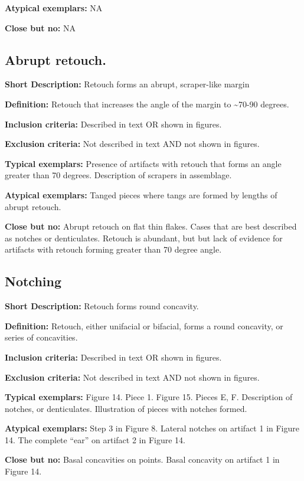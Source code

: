 \documentclass[
]{article}
\begin{document}
\textbf{Atypical exemplars:} NA

\textbf{Close but no:} NA

\subsection{Abrupt retouch.}\label{abrupt-retouch.}

\textbf{Short Description:} Retouch forms an abrupt, scraper-like margin

\textbf{Definition:} Retouch that increases the angle of the margin to
\textasciitilde70-90 degrees.

\textbf{Inclusion criteria:} Described in text OR shown in figures.

\textbf{Exclusion criteria:} Not described in text AND not shown in
figures.

\textbf{Typical exemplars:} Presence of artifacts with retouch that
forms an angle greater than 70 degrees. Description of scrapers in
assemblage.

\textbf{Atypical exemplars:} Tanged pieces where tangs are formed by
lengths of abrupt retouch.

\textbf{Close but no:} Abrupt retouch on flat thin flakes. Cases that
are best described as notches or denticulates. Retouch is abundant, but
but lack of evidence for artifacts with retouch forming greater than 70
degree angle.

\subsection{Notching}\label{notching}

\textbf{Short Description:} Retouch forms round concavity.

\textbf{Definition:} Retouch, either unifacial or bifacial, forms a
round concavity, or series of concavities.

\textbf{Inclusion criteria:} Described in text OR shown in figures.

\textbf{Exclusion criteria:} Not described in text AND not shown in
figures.

\textbf{Typical exemplars:} Figure 14. Piece 1. Figure 15. Pieces E, F.
Description of notches, or denticulates. Illustration of pieces with
notches formed.

\textbf{Atypical exemplars:} Step 3 in Figure 8. Lateral notches on
artifact 1 in Figure 14. The complete ``ear'' on artifact 2 in Figure
14.

\textbf{Close but no:} Basal concavities on points. Basal concavity on
artifact 1 in Figure 14.
\end{document}
